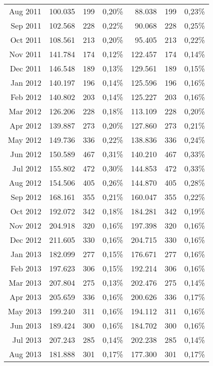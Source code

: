 \begin{longtable}{r|rrr|rrr}
Aug 2011 & 100.035 & 199   & 0,20\% & 88.038  & 199   & 0,23\% \\
Sep 2011 & 102.568 & 228   & 0,22\% & 90.068  & 228   & 0,25\% \\
Oct 2011 & 108.561 & 213   & 0,20\% & 95.405  & 213   & 0,22\% \\
Nov 2011 & 141.784 & 174   & 0,12\% & 122.457 & 174   & 0,14\% \\
Dec 2011 & 146.548 & 189   & 0,13\% & 129.561 & 189   & 0,15\% \\
Jan 2012 & 140.197 & 196   & 0,14\% & 125.596 & 196   & 0,16\% \\
Feb 2012 & 140.802 & 203   & 0,14\% & 125.227 & 203   & 0,16\% \\
Mar 2012 & 126.206 & 228   & 0,18\% & 113.109 & 228   & 0,20\% \\
Apr 2012 & 139.887 & 273   & 0,20\% & 127.860 & 273   & 0,21\% \\
May 2012 & 149.736 & 336   & 0,22\% & 138.836 & 336   & 0,24\% \\
Jun 2012 & 150.589 & 467   & 0,31\% & 140.210 & 467   & 0,33\% \\
Jul 2012 & 155.802 & 472   & 0,30\% & 144.853 & 472   & 0,33\% \\
Aug 2012 & 154.506 & 405   & 0,26\% & 144.870 & 405   & 0,28\% \\
Sep 2012 & 168.161 & 355   & 0,21\% & 160.047 & 355   & 0,22\% \\
Oct 2012 & 192.072 & 342   & 0,18\% & 184.281 & 342   & 0,19\% \\
Nov 2012 & 204.918 & 320   & 0,16\% & 197.398 & 320   & 0,16\% \\
Dec 2012 & 211.605 & 330   & 0,16\% & 204.715 & 330   & 0,16\% \\
Jan 2013 & 182.099 & 277   & 0,15\% & 176.671 & 277   & 0,16\% \\
Feb 2013 & 197.623 & 306   & 0,15\% & 192.214 & 306   & 0,16\% \\
Mar 2013 & 207.804 & 275   & 0,13\% & 202.476 & 275   & 0,14\% \\
Apr 2013 & 205.659 & 336   & 0,16\% & 200.626 & 336   & 0,17\% \\
May 2013 & 199.240 & 311   & 0,16\% & 194.112 & 311   & 0,16\% \\
Jun 2013 & 189.424 & 300   & 0,16\% & 184.702 & 300   & 0,16\% \\
Jul 2013 & 207.243 & 285   & 0,14\% & 202.238 & 285   & 0,14\% \\
Aug 2013 & 181.888 & 301   & 0,17\% & 177.300 & 301   & 0,17\% \\

\end{longtable}
